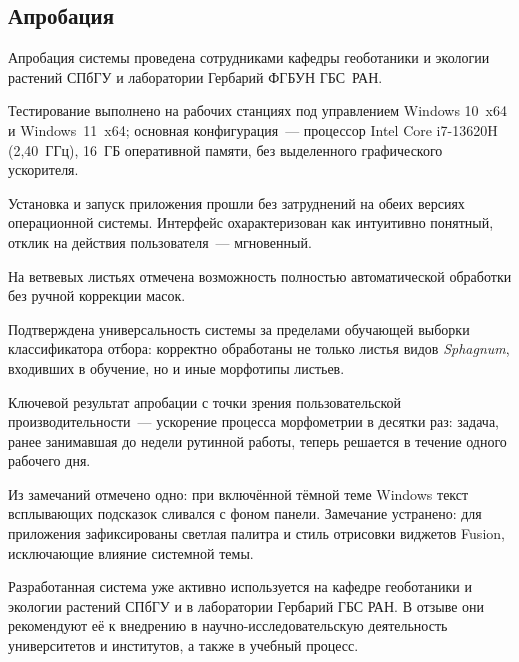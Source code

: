 \subsection{Апробация}

Апробация системы проведена сотрудниками кафедры геоботаники и экологии
растений СПбГУ и лаборатории Гербарий ФГБУН ГБС~РАН.

Тестирование выполнено на рабочих станциях под управлением Windows 10~x64
и Windows~11~x64; основная конфигурация~--- процессор Intel Core
i7\nobreakdash-13620H (2{,}40~ГГц), 16~ГБ оперативной памяти, без
выделенного графического ускорителя.

Установка и запуск приложения прошли без затруднений на обеих версиях
операционной системы. Интерфейс охарактеризован как интуитивно понятный,
отклик на действия пользователя~--- мгновенный. 

На ветвевых листьях отмечена возможность полностью автоматической обработки без ручной
коррекции масок.

Подтверждена универсальность системы за пределами обучающей выборки
классификатора отбора: корректно обработаны не только листья видов
\textit{Sphagnum}, входивших в обучение, но и иные морфотипы листьев.

Ключевой результат апробации с точки зрения пользовательской
производительности~--- ускорение процесса морфометрии в десятки раз:
задача, ранее занимавшая до недели рутинной работы, теперь решается
в течение одного рабочего дня.

Из замечаний отмечено одно: при включённой тёмной теме Windows текст
всплывающих подсказок сливался с фоном панели. Замечание устранено: для
приложения зафиксированы светлая палитра и стиль отрисовки виджетов
Fusion, исключающие влияние системной темы.

Разработанная система уже активно используется на кафедре
геоботаники и экологии растений СПбГУ и в лаборатории Гербарий
ГБС РАН. В отзыве они рекомендуют её к внедрению в научно-исследовательскую
деятельность университетов и институтов,
а также в учебный процесс.
